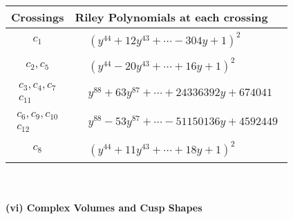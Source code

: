 \documentclass[1p]{elsarticle_modified}
\theoremstyle{definition}
\begin{document}
\begin{tabular}{m{50pt}|m{274pt}}
Crossings & \hspace{64pt}Riley Polynomials at each crossing \\
\hline $$\begin{aligned}c_{1}\end{aligned}$$&$\begin{aligned}
&(y^{44}+12 y^{43}+\cdots-304 y+1)^{2}
\end{aligned}$\\
\hline $$\begin{aligned}c_{2},c_{5}\end{aligned}$$&$\begin{aligned}
&(y^{44}-20 y^{43}+\cdots+16 y+1)^{2}
\end{aligned}$\\
\hline $$\begin{aligned}c_{3},c_{4},c_{7}\\c_{11}\end{aligned}$$&$\begin{aligned}
&y^{88}+63 y^{87}+\cdots+24336392 y+674041
\end{aligned}$\\
\hline $$\begin{aligned}c_{6},c_{9},c_{10}\\c_{12}\end{aligned}$$&$\begin{aligned}
&y^{88}-53 y^{87}+\cdots-51150136 y+4592449
\end{aligned}$\\
\hline $$\begin{aligned}c_{8}\end{aligned}$$&$\begin{aligned}
&(y^{44}+11 y^{43}+\cdots+18 y+1)^{2}
\end{aligned}$\\
\hline
\end{tabular}\\~\\
\newpage\flushleft \textbf{(vi) Complex Volumes and Cusp Shapes}
\end{document}
